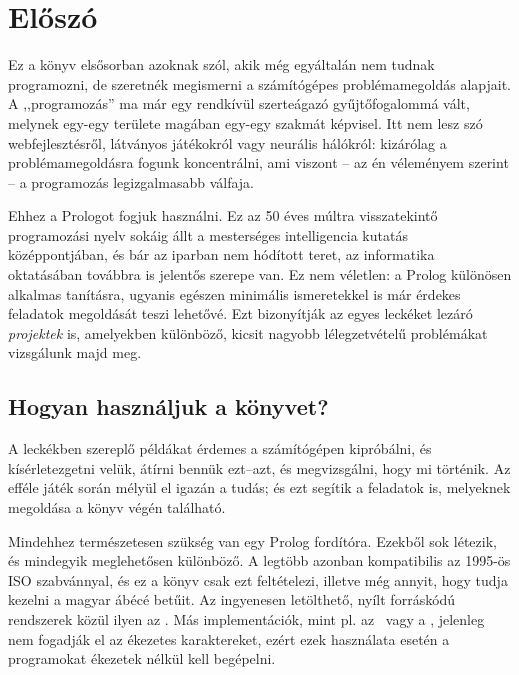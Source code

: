 \chapter{Előszó}
Ez a könyv elsősorban azoknak szól, akik még egyáltalán nem tudnak
programozni, de szeretnék megismerni a számítógépes problémamegoldás
alapjait. A ,,programozás'' ma már egy rendkívül szerteágazó
gyűjtőfogalommá vált, melynek egy-egy területe magában egy-egy szakmát
képvisel. Itt nem lesz szó webfejlesztésről, látványos játékokról vagy
neurális hálókról: kizárólag a problémamegoldásra fogunk koncentrálni,
ami viszont -- az én véleményem szerint -- a programozás
legizgalmasabb válfaja.

Ehhez a Prologot fogjuk használni. Ez az 50 éves múltra visszatekintő
programozási nyelv sokáig állt a mesterséges intelligencia kutatás
középpontjában, és bár az iparban nem hódított teret, az informatika
oktatásában továbbra is jelentős szerepe van. Ez nem véletlen: a
Prolog különösen alkalmas tanításra, ugyanis egészen minimális
ismeretekkel is már érdekes feladatok megoldását teszi lehetővé. Ezt
bizonyítják az egyes leckéket lezáró \emph{projektek} is, amelyekben
különböző, kicsit nagyobb lélegzetvételű problémákat vizsgálunk majd
meg.

\section*{Hogyan használjuk a könyvet?}
A leckékben szereplő példákat érdemes a számítógépen kipróbálni, és
kísérletezgetni velük, átírni bennük ezt--azt, és megvizsgálni, hogy mi
történik. Az efféle játék során mélyül el igazán a tudás; és ezt
segítik a feladatok is, melyeknek megoldása a könyv végén található.

Mindehhez természetesen szükség van egy Prolog fordítóra. Ezekből sok
létezik, és mindegyik meglehetősen különböző. A legtöbb azonban
kompatibilis az 1995-ös ISO szabvánnyal, és ez a könyv csak ezt
feltételezi, illetve még annyit, hogy tudja kezelni a magyar ábécé
betűit. Az ingyenesen letölthető, nyílt forráskódú rendszerek közül
ilyen az . Más implementációk, mint pl. az~
vagy a , jelenleg nem fogadják el az ékezetes
karaktereket, ezért ezek használata esetén a programokat ékezetek
nélkül kell begépelni.

